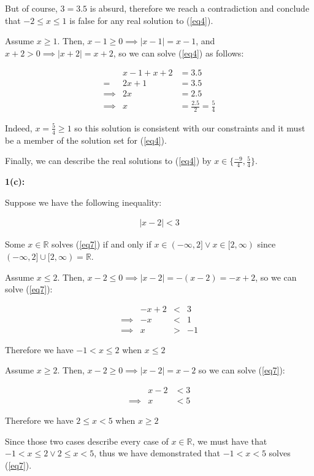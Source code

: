 \documentclass{article}
\newcommand{\reals}{\mathbb{R}}
\begin{document}
But of course, $3 = 3.5$ is absurd,
therefore we reach a contradiction
and conclude that $-2 \le x \le 1$ is false for any real solution to (\ref{eq4}).

Assume $x \geq 1$.
Then, $x-1 \geq 0 \implies |x-1| = x-1$,
and $x+2 > 0 \implies |x+2| = x+2$,
so we can solve (\ref{eq4}) as follows:

\begin{align}
	& x-1 +x+2 & = 3.5 \\
	= & 2x+1 & = 3.5 \\
	\implies & 2x & = 2.5 \\
	\label{eq6} \implies & x & = \frac{2.5}{2} = \frac{5}{4}
\end{align}

Indeed, $x = \frac{5}{4} \geq 1$ so this solution is consistent
with our constraints and it must be a member of the solution set for (\ref{eq4}).

Finally, we can describe the real solutions
to (\ref{eq4}) by $x \in \{ \frac{-9}{4}, \frac{5}{4} \}$.

\medskip
\textbf{1(c):}

Suppose we have the following inequality: 

\begin{align} \label{eq7}
	|x-2| < 3
\end{align}

Some $x \in \reals$ solves (\ref{eq7}) if and only if
$x \in (-\infty,2] \lor x \in [2, \infty)$
since $(-\infty,2] \cup [2,\infty) = \reals$.


Assume $x \le 2$.
Then, $x - 2 \le 0 \implies |x-2| = -(x-2) = -x+2$,
so we can solve (\ref{eq7}):

\begin{align}
	&-x+2 &< &3 \\
	\implies &-x &< &1 \\
	\implies &x & > &-1
\end{align}

Therefore we have $-1 < x \le 2$ when $x \le 2$

Assume $x \geq 2$.
Then, $x - 2 \geq 0 \implies |x-2| = x-2$
so we can solve (\ref{eq7}):

\begin{align}
	&x-2 &< 3 \\
	\implies &x &< 5
\end{align}

Therefore we have $2 \le x < 5$ when $x \geq 2$

Since those two cases describe every case of $x \in \reals$,
we must have that $-1 < x \le 2 \lor 2 \le x < 5$,
thus we have demonstrated that $-1 < x < 5$ solves (\ref{eq7}).
\end{document}
